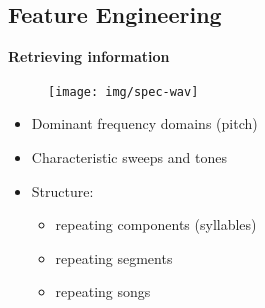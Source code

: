 \documentclass[t, xcolor={dvipsnames}]{beamer}
\begin{document}


\subsection{Feature Engineering}
\begin{frame}[fragile]
  \vspace{0.5cm}
  {\bfseries\Large Retrieving information}\\
  \begin{figure}
    \texttt{[image: img/spec-wav]}
  \end{figure}
  \vspace{-0.3cm}
  \begin{addmargin}{0.5cm}
    \begin{itemize}
      \item Dominant frequency domains (pitch)
      \item Characteristic sweeps and tones
      \item Structure:
      \begin{itemize}
        \item repeating components (syllables)
        \item repeating segments
        \item repeating songs
      \end{itemize}
    \end{itemize}
  \end{addmargin}
\end{frame}

\end{document}
